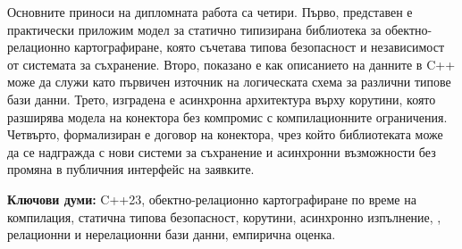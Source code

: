 Основните приноси на дипломната работа са четири. Първо, представен е практически приложим модел за статично типизирана библиотека за обектно-релационно картографиране, която съчетава типова безопасност и независимост от системата за съхранение. Второ, показано е как описанието на данните в C++ може да служи като първичен източник на логическата схема за различни типове бази данни. Трето, изградена е асинхронна архитектура върху корутини, която разширява модела на конектора без компромис с компилационните ограничения. Четвърто, формализиран е договор на конектора, чрез който библиотеката може да се надгражда с нови системи за съхранение и асинхронни възможности без промяна в публичния интерфейс на заявките.

\vspace{1cm}

\textbf{Ключови думи:} C++23, обектно-релационно картографиране по време на компилация, статична типова безопасност, корутини, асинхронно изпълнение, , релационни и нерелационни бази данни, емпирична оценка.
